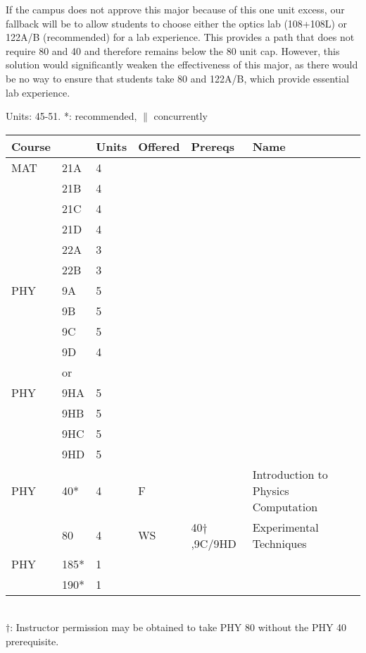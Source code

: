 \documentclass[12pt]{article}
\begin{document}
If the campus does not approve this major because of this one unit
excess, our fallback will be to allow students to choose either the
optics lab (108+108L) or 122A/B (recommended) for a lab experience.
This provides a path that does not require 80 and 40 and therefore
remains below the 80 unit cap.  However, this solution would
significantly weaken the effectiveness of this major, as there would
be no way to ensure that students take 80 and 122A/B, which
provide essential lab experience.


\vskip 2cm
\noindent
\vskip 0.25cm
Units:  45-51. *: recommended, $\parallel$ concurrently\\
\begin{tabular}{|llllll|}
\hline
Course & & Units & Offered & Prereqs & Name \\
\hline
MAT & 21A & 4 & &&\\
    & 21B & 4 & &&\\
    & 21C & 4 & &&\\
    & 21D & 4 & &&\\
    & 22A & 3 & &&\\
    & 22B & 3 & &&\\
\hline
\hline

PHY & 9A & 5 & &&\\
    & 9B & 5 & &&\\
    & 9C & 5 & &&\\
    & 9D & 4 & &&\\
\hline
&or&&\\
\hline
PHY & 9HA & 5 & &&\\
    & 9HB & 5 & &&\\
    & 9HC & 5 & &&\\
    & 9HD & 5 & &&\\
\hline
\hline
PHY & 40*  & 4 & F & & Introduction to Physics Computation \\ 
    & 80  & 4 & WS & 40$\dagger$,9C/9HD     & Experimental Techniques \\
PHY & 185* & 1 & &&\\
    & 190* & 1 & &&\\
\hline
\end{tabular}\\
$\dagger$:  Instructor permission may be obtained to take PHY 80 without the PHY 40 prerequisite.
\end{document}
